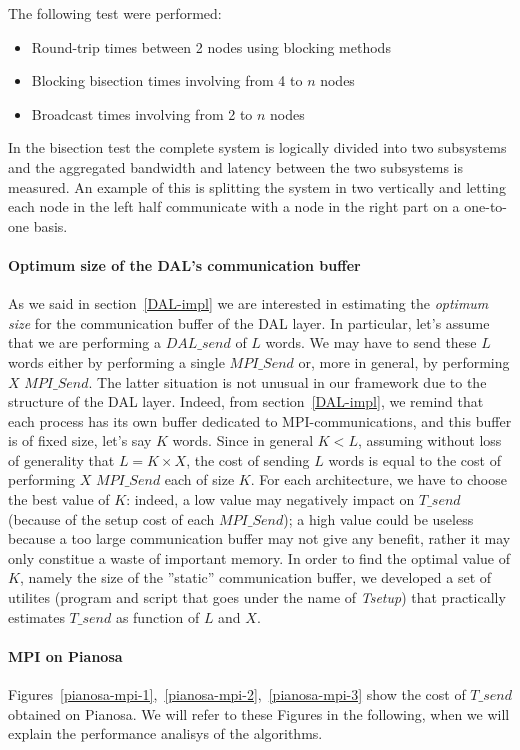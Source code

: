 The following test were performed:
\begin{itemize}
	\item Round-trip times between 2 nodes using blocking methods
	\item Blocking bisection times involving from 4 to $n$ nodes
	\item Broadcast times involving from 2 to $n$ nodes
\end{itemize}
In the bisection test the complete system is logically divided into two subsystems and the aggregated bandwidth and latency between the two subsystems is measured. An example of this is splitting the system in two vertically and letting each node in the left half communicate with a node in the right part on a one-to-one basis.

\paragraph{Optimum size of the DAL's communication buffer}
As we said in section~\ref{DAL-impl} we are interested in estimating the \textit{optimum size} for the communication buffer of the DAL layer. In particular, let's assume that we are performing a $DAL\_send$ of $L$ words. We may have to send these $L$ words either by performing a single $MPI\_Send$ or, more in general, by performing $X$ $MPI\_Send$. The latter situation is not unusual in our framework due to the structure of the DAL layer. Indeed, from section~\ref{DAL-impl}, we remind that each process has its own buffer dedicated to MPI-communications, and this buffer is of fixed size, let's say $K$ words. Since in general $K < L$, assuming without loss of generality that $L = K \times X$, the cost of sending $L$ words is equal to the cost of performing $X$ $MPI\_Send$ each of size $K$. For each architecture, we have to choose the best value of $K$: indeed, a low value may negatively impact on $T\_send$ (because of the setup cost of each $MPI\_Send$); a high value could be useless because a too large communication buffer may not give any benefit, rather it may only constitue a waste of important memory. In order to find the optimal value of $K$, namely the size of the ''static'' communication buffer, we developed a set of utilites (program and script that goes under the name of \textit{Tsetup}) that practically estimates $T\_send$ as function of $L$ and $X$. 

\paragraph{MPI on Pianosa}
\label{test-env-pianosa}
Figures~\ref{pianosa-mpi-1},~\ref{pianosa-mpi-2},~\ref{pianosa-mpi-3} show the cost of $T\_send$ obtained on Pianosa. We will refer to these Figures in the following, when we will explain the performance analisys of the algorithms.

